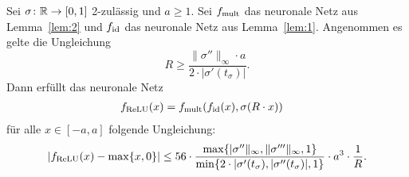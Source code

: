   \begin{lem}
  \label{lem:3}
  Sei $\sigma\colon \mathbb{R} \to [0, 1]$ 2-zulässig und $a \geq 1$. Sei $f_{\mathrm{mult}}$ das neuronale Netz aus Lemma~\ref{lem:2} und $f_{\mathrm{id}}$ das neuronale Netz aus Lemma~\ref{lem:1}. Angenommen es gelte die Ungleichung 
\begin{equation}
\label{lem:3:Vor1}   
 R \geq \frac{\|\sigma''\|_{\infty} \cdot a}{2 \cdot |\sigma'(t_{\sigma})|}.
\end{equation}
  Dann erfüllt das neuronale Netz 
  \begin{equation}
  \label{lem:3:Vor2}
  \begin{split}
  f_{\mathrm{ReLU}}(x) & = f_{\mathrm{mult}}(f_{\mathrm{id}}(x), \sigma(R \cdot x)) 
  \end{split}
  \end{equation}
 für alle $x \in [-a, a]$ folgende Ungleichung:
 $$|f_{\mathrm{ReLU}}(x) - \max\{x, 0\}| \leq 56 \cdot \frac{\max\{|\sigma''\|_{\infty}, \|\sigma'''\|_{\infty}, 1\}}{\min\{2 \cdot |\sigma'(t_{\sigma}), |\sigma''(t_{\sigma})|, 1\}} \cdot a^3 \cdot \frac{1}{R}.$$
  \end{lem}

